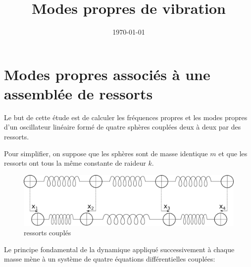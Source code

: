 \documentclass[a4paper, 12pt]{article}
\begin{document}


\title{Modes propres de vibration}

\date{\today}
 
\maketitle


\section{Modes propres associés à une assemblée de ressorts}


Le but de cette étude est de calculer les fréquences propres et les modes propres d'un oscillateur
linéaire formé de  quatre sphères  couplées deux à deux par des ressorts. 

Pour simplifier, on suppose que les sphères sont de masse identique $m$ et que les  ressorts
ont tous la même constante de  raideur $k$.   

\begin{figure}[!h]
\centering
\includegraphics[scale=0.4]{spring4m.eps}
\caption{ressorts couplés}
\label{Res}
\end{figure}


Le principe fondamental de la dynamique appliqué successivement à chaque masse mène à un système
de quatre équations différentielles couplées:
\end{document}

